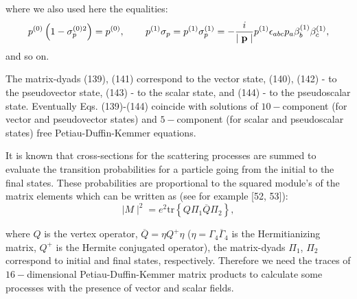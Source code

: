 \documentclass[a4paper,12pt]{article}
\begin{document}
where we also used here the equalities:
\[
p^{(0)}\left( 1-\sigma _p^{(0)2}\right) =p^{(0)} ,
\hspace{0.3in}p^{(1)}\sigma _p=p^{(1)}\sigma _p^{(1)}=-\frac
i{\mid \mathbf{p}\mid }p^{(1)}\epsilon _{abc}p_a\beta
_b^{(1)}\beta _c^{(1)} ,
\]
and so on.

The matrix-dyads (139), (141) correspond to the vector state,
(140), (142) - to the pseudovector state, (143) - to the scalar
state, and (144) - to the pseudoscalar state. Eventually Eqs.
(139)-(144) coincide with solutions of $ 10-$component (for vector
and pseudovector states) and $5-$component (for scalar and
pseudoscalar states) free Petiau-Duffin-Kemmer equations.

It is known that cross-sections for the scattering processes are
summed to evaluate the transition probabilities for a particle
going from the initial to the final states. These probabilities
are proportional to the squared module's of the matrix elements
which can be written as (see for example [52, 53]):
\begin{equation}
\mid M\mid ^2=e^2\mbox{tr}\left\{ Q\Pi _1\overline{Q}\Pi
_2\right\} ,\label{145}
\end{equation}

where $Q$ is the vertex operator, $\overline{Q}=\eta Q^{+}\eta $
($\eta =\Gamma _4\overline{\Gamma }_4$ is the Hermitianizing
matrix, $Q^{+}$ is the Hermite conjugated operator), the
matrix-dyads $\Pi _1$, $\Pi _2$ correspond to initial and final
states, respectively. Therefore we need the traces of $
16-$dimensional Petiau-Duffin-Kemmer matrix products to calculate
some processes with the presence of vector and scalar fields.
\end{document}
